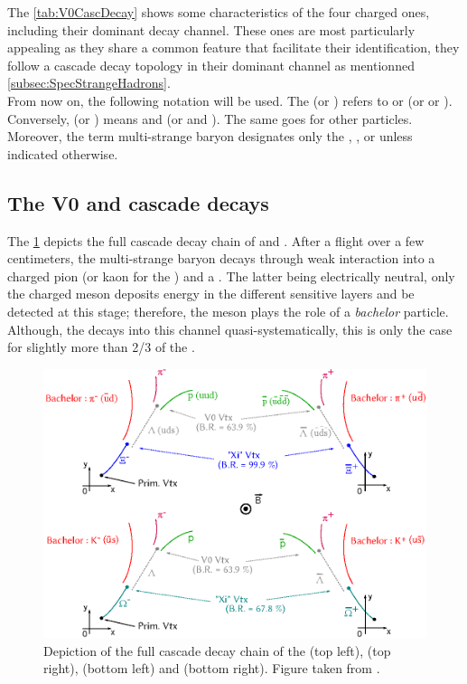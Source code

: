 The \tab\ref{tab:V0CascDecay} shows some characteristics of the four charged ones, including their dominant decay channel. These ones are most particularly appealing as they share a common feature that facilitate their identification, they follow a cascade decay topology in their dominant channel as 
mentionned \ref{subsec:SpecStrangeHadrons}.\\


From now on, the following notation will be used. The \rmXiPM (or \rmOmegaPM) refers to \rmXiM or \rmAxiP (or \rmOmegaM or \rmAomegaP). Conversely, \rmXi (or \rmOmega) means \rmXiM and \rmAxiP (or \rmOmegaM and \rmAomegaP). The same goes for other particles. Moreover, the term multi-strange baryon designates only the \rmXiM, \rmAxiP, \rmOmegaM or \rmAomegaP unless indicated otherwise.


\subsection{The V0 and cascade decays}
\label{subsec:V0CascDecays}


The \fig\ref{fig:CascadeDecay} depicts the full cascade decay chain of \rmXi and \rmOmega. After a flight over a few centimeters, the multi-strange baryon decays through weak interaction into a charged pion (or kaon for the \rmOmega) and a \rmLambda. The latter being electrically neutral, only the charged meson deposits energy in the different sensitive layers and be detected at this stage; therefore, the meson plays the role of a \textit{bachelor} particle. Although, the \rmXiPM decays into this channel quasi-systematically, this is only the case for slightly more than 2/3 of the \rmOmegaPM.

\begin{figure}[t]
	\centering
	\includegraphics[width=1\textwidth]{Figs/Chapter4/Schema-4TypesDeCascade.eps}
	\caption{Depiction of the full cascade decay chain of the \rmXiM (top left), \rmAxiP (top right), \rmOmegaM (bottom left) and \rmAomegaP (bottom right). Figure taken from \cite{maireFourTypesCascade2011}.}
	\label{fig:CascadeDecay}
\end{figure}

